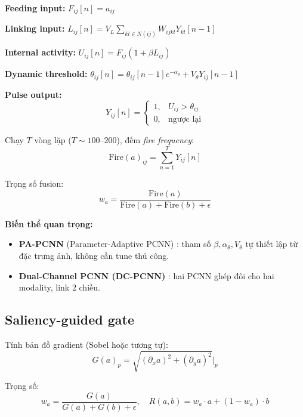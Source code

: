 \documentclass[12pt,a4paper]{article}
\begin{document}
\textbf{Feeding input:} $F_{ij}[n] = a_{ij}$

\textbf{Linking input:} $L_{ij}[n] = V_L \sum_{kl \in N(ij)} W_{ijkl} Y_{kl}[n-1]$

\textbf{Internal activity:} $U_{ij}[n] = F_{ij}(1 + \beta L_{ij})$

\textbf{Dynamic threshold:} $\theta_{ij}[n] = \theta_{ij}[n-1] e^{-\alpha_\theta} + V_\theta Y_{ij}[n-1]$

\textbf{Pulse output:}
\begin{equation}
Y_{ij}[n] = \begin{cases} 1, & U_{ij} > \theta_{ij} \\ 0, & \text{ngược lại} \end{cases}
\end{equation}

Chạy $T$ vòng lặp ($T \sim 100$--$200$), đếm \emph{fire frequency}:
\begin{equation}
\mathrm{Fire}(a)_{ij} = \sum_{n=1}^{T} Y_{ij}[n]
\end{equation}

Trọng số fusion:
\begin{equation}
w_a = \frac{\mathrm{Fire}(a)}{\mathrm{Fire}(a) + \mathrm{Fire}(b) + \epsilon}
\end{equation}

\textbf{Biến thể quan trọng:}
\begin{itemize}\itemsep0pt
    \item \textbf{PA-PCNN} (Parameter-Adaptive PCNN) \cite{yin2019papcnn}: tham số $\beta, \alpha_\theta, V_\theta$ tự thiết lập từ đặc trưng ảnh, không cần tune thủ công.
    \item \textbf{Dual-Channel PCNN (DC-PCNN)} \cite{wang2014dcpcnn}: hai PCNN ghép đôi cho hai modality, link 2 chiều.
\end{itemize}

\subsection{Saliency-guided gate}

Tính bản đồ gradient (Sobel hoặc tương tự):
\begin{equation}
G(a)_p = \sqrt{(\partial_x a)^2 + (\partial_y a)^2}\Big|_p
\end{equation}

Trọng số:
\begin{equation}
w_a = \frac{G(a)}{G(a) + G(b) + \epsilon}, \quad R(a, b) = w_a \cdot a + (1 - w_a) \cdot b
\end{equation}
\end{document}
